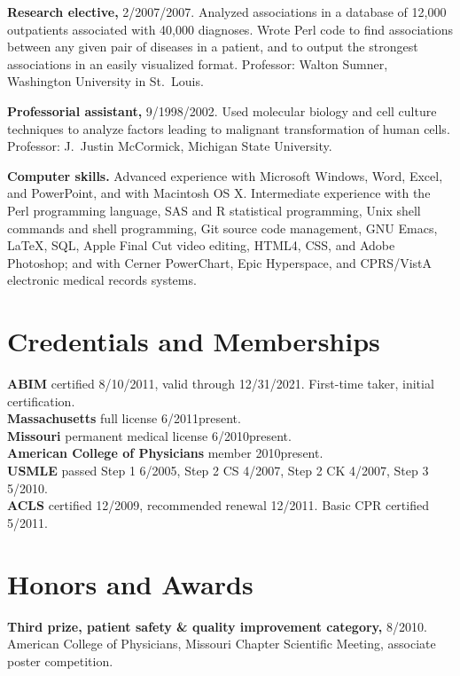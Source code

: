 \documentclass[12pt]{article}
\begin{document}
\textbf{Research elective,} 2/2007/2007. Analyzed associations
in a database of 12,000 outpatients associated with 40,000 diagnoses.
Wrote Perl code to find associations between any given pair of
diseases in a patient, and to output the strongest associations in an
easily visualized format. Professor: Walton Sumner, Washington
University in St.\ Louis.

\textbf{Professorial assistant,} 9/1998/2002. Used molecular
biology and cell culture techniques to analyze factors leading to
malignant transformation of human cells. Professor: J.\ Justin
McCormick, Michigan State University.

\textbf{Computer skills.} Advanced experience with Microsoft Windows, Word,
Excel, and PowerPoint, and with Macintosh OS X. Intermediate
experience with the Perl programming language, SAS and R statistical
programming, Unix shell commands and shell programming, Git source
code management, GNU Emacs, \LaTeX, SQL, Apple Final Cut video editing,
HTML4, CSS, and Adobe Photoshop; and with Cerner PowerChart, Epic
Hyperspace, and CPRS/VistA electronic medical records systems.

\section{Credentials and Memberships}

\textbf{ABIM} certified 8/10/2011, valid through 12/31/2021. First-time taker,
initial certification.\\
\textbf{Massachusetts} full license 6/2011\ndash{}present.\\
\textbf{Missouri} permanent medical license 6/2010\ndash{}present.\\
\textbf{American College of Physicians} member 2010\ndash{}present.\\
\textbf{USMLE} passed Step 1 6/2005, Step 2 CS 4/2007, Step 2 CK 4/2007, Step 3
5/2010.\\
\textbf{ACLS} certified 12/2009, recommended renewal 12/2011. Basic CPR
certified 5/2011.

\section{Honors and Awards}

\textbf{Third prize, patient safety \& quality improvement category,} 8/2010.
American College of Physicians, Missouri Chapter Scientific Meeting,
associate poster competition.
\end{document}
